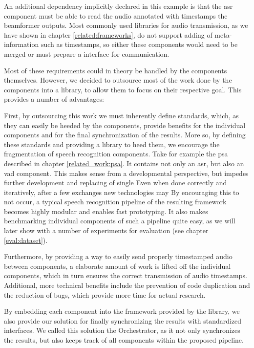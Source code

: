 An additional dependency implicitly declared in this example is that the \gls{asr} component must be able to read the audio annotated with timestamps the beamformer outputs.
Most commonly used libraries for audio transmission, as we have shown in chapter \ref{related:frameworks}, do not support adding of meta-information such as timestamps, so either these components would need to be merged or must prepare a interface for communication.

Most of these requirements could in theory be handled by the components themselves.
However, we decided to outsource most of the work done by the components into a library, to allow them to focus on their respective goal.
This provides a number of advantages:

First, by outsourcing this work we must inherently define standards, which, as they can easily be heeded by the components, provide benefits for the individual components and for the final synchronization of the results.
More so, by defining these standards and providing a library to heed them, we encourage the fragmentation of speech recognition components. 
Take for example the \gls{psa} described in chapter \ref{related_work:psa}.
It contains not only an \gls{asr}, but also an \gls{vad} component.
This makes sense from a developmental perspective, but impedes further development and replacing of single 
Even when done correctly and iteratively, after a few exchanges new technologies may 
By encouraging this to not occur, a typical speech recognition pipeline of the resulting framework becomes highly modular and enables fast prototyping.
It also makes benchmarking individual components of such a pipeline quite easy, as we will later show with a number of experiments for evaluation (see chapter \ref{eval:dataset}).

Furthermore, by providing a way to easily send properly timestamped audio between components, a elaborate amount of work is lifted off the individual components, which in turn ensures the correct transmission of audio timestamps.
Additional, more technical benefits include the prevention of code duplication and the reduction of bugs, which provide more time for actual research.

By embedding each component into the framework provided by the library, we also provide our solution for finally synchronizing the results with standardized interfaces.
We called this solution the Orchestrator, as it not only synchronizes the results, but also keeps track of all components within the proposed pipeline.

